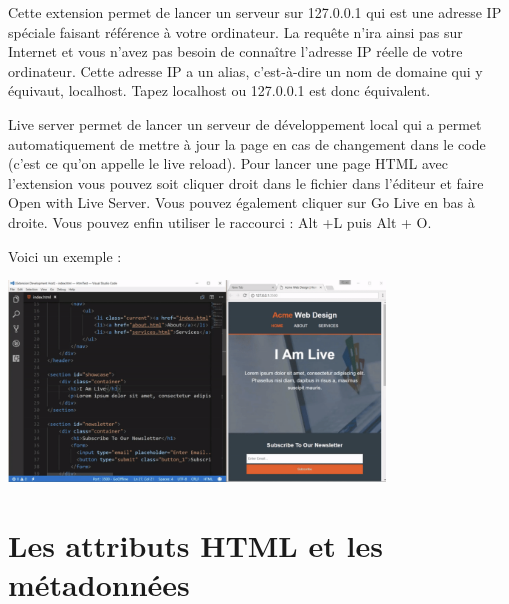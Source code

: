 \documentclass[a4paper]{article}
\begin{document}
Cette extension permet de lancer un serveur sur {\color{monOrange}127.0.0.1} qui est une adresse {\color{monOrange}IP} spéciale faisant référence à votre ordinateur. La requête n'ira ainsi pas sur {\color{monOrange}Internet} et vous n'avez pas besoin de connaître l'adresse {\color{monOrange}IP} réelle de votre ordinateur. Cette adresse {\color{monOrange}IP} a un alias, c'est-à-dire un nom de domaine qui y équivaut, {\color{monOrange}localhost}. Tapez {\color{monOrange}localhost} ou {\color{monOrange}127.0.0.1} est donc équivalent.

{\color{monOrange}Live server} permet de lancer un serveur de développement local qui a permet automatiquement de mettre à jour la page en cas de changement dans le code (c'est ce qu'on appelle le {\color{monOrange}live reload}). Pour lancer une page {\color{monOrange}HTML} avec l'extension vous pouvez soit cliquer droit dans le fichier dans l'éditeur et faire {\color{monOrange}Open with Live Server}. Vous pouvez également cliquer sur {\color{monOrange}Go Live} en bas à droite. Vous pouvez enfin utiliser le raccourci : {\color{monOrange}Alt +L} puis {\color{monOrange}Alt + O}.

Voici un exemple :

\begin{center}
\includegraphics[width=10cm]{images/image04.png}
\end{center}


\section{Les attributs HTML et les métadonnées}
\end{document}
